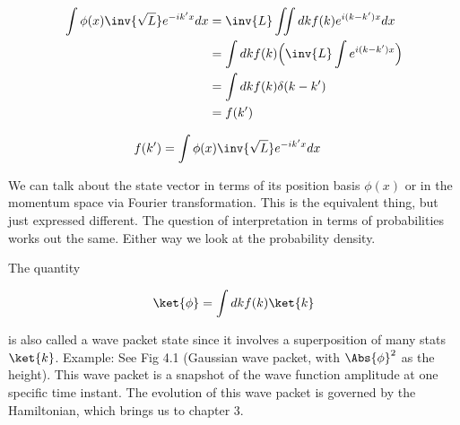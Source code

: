 \begin{align*}
\int \phi(x) \inv{\sqrt{L}} e^{-ik'x} dx
&= \inv{L} \iint dk f(k) e^{i(k-k')x} dx \\
&= \int dk f(k) \Bigl( \inv{L} \int e^{i(k-k')x} \Bigr) \\
&= \int dk f(k) \delta(k-k') \\
&= f(k')
\end{align*}

\begin{align*}
f(k') &=
\int \phi(x) \inv{\sqrt{L}} e^{-ik'x} dx
\end{align*}

We can talk about the state vector in terms of its position basis $\phi(x)$ or in the momentum space via Fourier transformation.  This is the equivalent thing, but just expressed different.  The question of interpretation in terms of probabilities works out the same.  Either way we look at the probability density.

The quantity

\begin{align*}
\ket{\phi} = \int dk f(k) \ket{k}
\end{align*}

is also called a wave packet state since it involves a superposition of many stats $\ket{k}$.  Example: See Fig 4.1 (Gaussian wave packet, with $\Abs{\phi}^2$ as the height).  This wave packet is a snapshot of the wave function amplitude at one specific time instant.  The evolution of this wave packet is governed by the Hamiltonian, which brings us to chapter 3.

